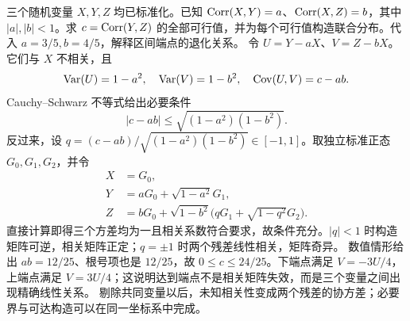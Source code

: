 三个随机变量 $X,Y,Z$ 均已标准化。已知 $\operatorname{Corr}(X,Y)=a$、$\operatorname{Corr}(X,Z)=b$，其中 $|a|,|b|<1$。求 $c=\operatorname{Corr}(Y,Z)$ 的全部可行值，并为每个可行值构造联合分布。代入 $a=3/5,b=4/5$，解释区间端点的退化关系。
\solution 令 $U=Y-aX$、$V=Z-bX$。它们与 $X$ 不相关，且
\[
 \operatorname{Var}(U)=1-a^2,\quad\operatorname{Var}(V)=1-b^2,
 \quad\operatorname{Cov}(U,V)=c-ab.
\]
Cauchy--Schwarz 不等式给出必要条件
\[
 \boxed{|c-ab|\le\sqrt{(1-a^2)(1-b^2)}}.
\]
反过来，设 $q=(c-ab)/\sqrt{(1-a^2)(1-b^2)}\in[-1,1]$。取独立标准正态 $G_0,G_1,G_2$，并令
\[
 \begin{aligned}
 X&=G_0,\\
 Y&=aG_0+\sqrt{1-a^2}G_1,\\
 Z&=bG_0+\sqrt{1-b^2}\bigl(qG_1+\sqrt{1-q^2}G_2\bigr).
 \end{aligned}
\]
直接计算即得三个方差均为一且相关系数符合要求，故条件充分。$|q|<1$ 时构造矩阵可逆，相关矩阵正定；$q=\pm1$ 时两个残差线性相关，矩阵奇异。
数值情形给出 $ab=12/25$、根号项也是 $12/25$，故 $0\le c\le24/25$。下端点满足 $V=-3U/4$，上端点满足 $V=3U/4$；这说明达到端点不是相关矩阵失效，而是三个变量之间出现精确线性关系。
\insight 剔除共同变量以后，未知相关性变成两个残差的协方差；必要界与可达构造可以在同一坐标系中完成。
